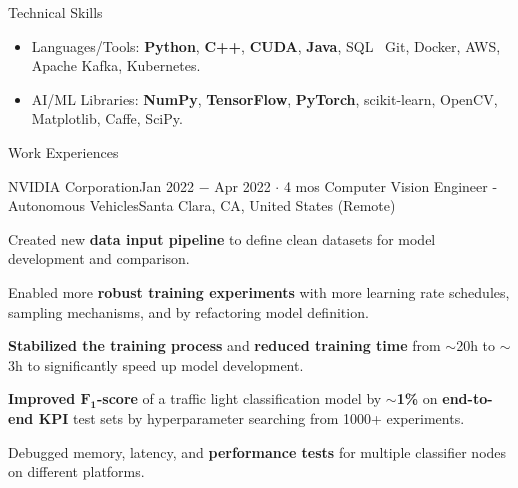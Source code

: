 \documentclass{resume}
\begin{document}
\begin{rSection}{Technical Skills}

    \begin{itemize}
        \item Languages/Tools: \textbf{Python}, \textbf{C++}, \textbf{CUDA}, \textbf{Java}, SQL \textbar\ Git, Docker, AWS, Apache Kafka, Kubernetes.
        \item AI/ML Libraries: \textbf{NumPy}, \textbf{TensorFlow}, \textbf{PyTorch}, scikit-learn, OpenCV, Matplotlib, Caffe, SciPy.
    \end{itemize}

\end{rSection}

\begin{rSection}{Work Experiences}

    \begin{rSubsection}{NVIDIA Corporation}{Jan 2022 \(-\) Apr 2022 \(\cdot\) 4 mos}
        {Computer Vision Engineer - Autonomous Vehicles}{Santa Clara, CA, United States (Remote)}
        \item Created new \textbf{data input pipeline} to define clean datasets for model development and comparison.
        \item Enabled more \textbf{robust training experiments} with more learning rate schedules, sampling mechanisms, and by refactoring model definition.
        \item \textbf{Stabilized the training process} and \textbf{reduced training time} from \(\sim\)20h to \(\sim\)3h to significantly speed up model development.
        \item \textbf{Improved \(\boldsymbol{F_{1}}\)-score} of a traffic light classification model by \(\sim\)\textbf{1\%} on \textbf{end-to-end KPI} test sets by hyperparameter searching from 1000+ experiments.
        \item Debugged memory, latency, and \textbf{performance tests} for multiple classifier nodes on different platforms.
    \end{rSubsection}


\end{rSection}
\end{document}
